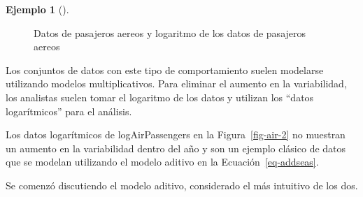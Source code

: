 \documentclass[
  us-letterpaper,
]{scrreprt}
\theoremstyle{definition}
\newtheorem{example}{Ejemplo}[chapter]
\theoremstyle{plain}
\theoremstyle{plain}
\theoremstyle{definition}
\theoremstyle{remark}
\begin{document}
\begin{example}[]
\begin{tcolorbox}
\begin{figure}[H]
\begin{minipage}{0.50\linewidth}
{}


\end{minipage}%
%
\begin{minipage}{0.50\linewidth}



\end{minipage}%

\caption{\label{fig-air}Datos de pasajeros aereos y logaritmo de los
datos de pasajeros aereos}

\end{figure}%

Los conjuntos de datos con este tipo de comportamiento suelen modelarse
utilizando modelos multiplicativos. Para eliminar el aumento en la
variabilidad, los analistas suelen tomar el logaritmo de los datos y
utilizan los ``datos logarítmicos'' para el análisis.

Los datos logarítmicos de logAirPassengers en la Figura~\ref{fig-air-2}
no muestran un aumento en la variabilidad dentro del año y son un
ejemplo clásico de datos que se modelan utilizando el modelo aditivo en
la Ecuación~\ref{eq-addseas}.

\end{tcolorbox}

\end{example}

Se comenzó discutiendo el modelo aditivo, considerado el más intuitivo
de los dos.
\end{document}
